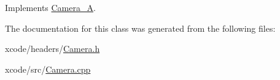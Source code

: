 Implements \hyperlink{class_camera___a_a9545b869b944da4a9baa528b8a1fef8e}{Camera\-\_\-\-A}.



The documentation for this class was generated from the following files\-:\begin{DoxyCompactItemize}
\item 
xcode/headers/\hyperlink{_camera_8h}{Camera.\-h}\item 
xcode/src/\hyperlink{_camera_8cpp}{Camera.\-cpp}\end{DoxyCompactItemize}
